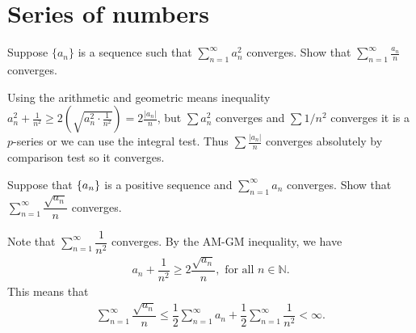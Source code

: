\section{Series of numbers}\label{p:series}

\begin{problem}
Suppose $\{a_n\}$ is a sequence such that $\displaystyle \sum_{n=1}^\infty a_n^2$ converges. Show that $\displaystyle\sum_{n=1}^\infty \frac{a_n}n $ converges.
\begin{solution}
Using the arithmetic and geometric means inequality $a_n^2 + \frac{1}{n^2} \geq 2 ( \sqrt{a_n^2 \cdot \frac{1}{n^2}})= 2 \frac{|a_n|}{n}$, but $\sum a_n^2$ converges and $\sum 1/n^2$ converges it is a $p$-series or we can use the integral test. Thus $\sum \frac{|a_n|}{n}$ converges absolutely by comparison test so it converges.
\end{solution}
\end{problem}

\begin{problem}
Suppose that $\left\{ a_n\right\}$ is a positive sequence and $\sum_{n=1}^\infty a_n$ converges. Show that $\sum_{n=1}^\infty \dfrac{\sqrt{a_n}}{n}$ converges.
\begin{solution}
Note that $\sum_{n=1}^\infty \dfrac{1}{n^2}$ converges. By the AM-GM inequality, we have 
\begin{align*}
    a_n+\dfrac{1}{n^2}\ge 2\dfrac{\sqrt{a_n}}{n},\text{ for all }n\in\mathbb{N}.
\end{align*}
This means that 
\begin{align*}
    \sum_{n=1}^\infty \dfrac{\sqrt{a_n}}{n}\le \dfrac{1}{2}\sum_{n=1}^\infty a_n+\dfrac{1}{2}\sum_{n=1}^\infty \dfrac{1}{n^2}<\infty.
\end{align*}
\end{solution}
\end{problem}

